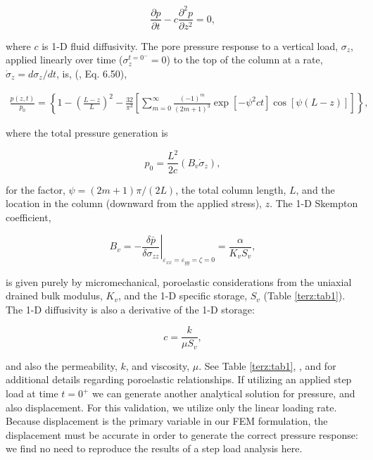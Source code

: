\begin{equation}
\frac{\partial p}{\partial t}-c\frac{{{\partial }^{2}}p}{\partial {{z}^{2}}}=0,
\end{equation}

where $c$ is 1-D fluid diffusivity.  The pore pressure response to a vertical load, $\sigma _{z}$, applied linearly over time ($\sigma _{z}^{t={{0}^{-}}}=0$) to the top of the column at a rate, ${{\dot{\sigma }}_{z}}=d{{\sigma }_{z}}/dt$, is, (\cite{Wang:00}, Eq. 6.50),

\begin{equation}
\begin{split}
\frac{p\left( z,t \right)}{{{p}_{0}}}=\left\{ 1-{{\left( \frac{L-z}{L} \right)}^{2}}-\right.\left. \frac{32}{{{\pi }^{3}}}\left[ \sum\limits_{m=0}^{\infty }{\frac{{{\left( -1 \right)}^{m}}}{{{\left( 2m+1 \right)}^{3}}}\exp \left[ -{{\psi }^{2}}ct \right]\cos \left[ \psi \left( L-z \right) \right]} \right] \right\},
\end{split}
\end{equation}

where the total pressure generation is

\begin{equation}
{{p}_{0}}=\frac{{{L}^{2}}}{2c}\left( {{B}_{v}}{{{\dot{\sigma }}}_{z}} \right),
\end{equation}

for the factor, $\psi =\left( 2m+1 \right)\pi /\left( 2L \right)$, the total column length, $L$, and the location in the column (downward from the applied stress), $z$. The 1-D Skempton coefficient,

\begin{equation}
{{B}_{v}}={{\left. -\frac{\delta \bar{p}}{\delta {{\sigma }_{zz}}} \right|}_{{{\varepsilon }_{xx}}={{\varepsilon }_{yy}}=\zeta =0}}=\frac{\alpha }{{{K}_{v}}{{S}_{v}}},
\end{equation}

is given purely by micromechanical, poroelastic considerations from the uniaxial drained bulk modulus, $K_{v}$, and the 1-D specific storage, $S_{v}$ (Table \ref{terz:tab1}). The 1-D diffusivity is also a derivative of the 1-D storage:

\begin{equation}
c=\frac{k}{\mu {{S}_{v}}},
\end{equation}

and also the permeability, $k$, and viscosity, $\mu$. See Table \ref{terz:tab1}, \cite{DetournayCheng:93}, and \cite{Wang:00} for additional details regarding poroelastic relationships. If utilizing an applied step load at time $t={{0}^{+}}$ we can generate another analytical solution for pressure, and also displacement. For this validation, we utilize only the linear loading rate. Because displacement is the primary variable in our FEM formulation, the displacement must be accurate in order to generate the correct pressure response: we find no need to reproduce the results of a step load analysis here.

